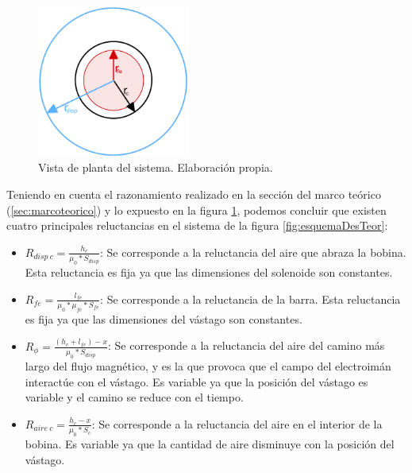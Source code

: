 \begin{figure}[H]
    \centering
    \includegraphics[width=5cm]{FigurasMemoria/areasFlujo.jpg}
    \caption{Vista de planta del sistema. Elaboración propia.}
    \label{fig:areasFlujo} %
\end{figure}

Teniendo en cuenta el razonamiento realizado en la sección del marco teórico (\ref{sec:marcoteorico}) y lo expuesto en la figura \ref{fig:areasFlujo}, podemos concluir que existen cuatro principales reluctancias en el sistema de la figura \ref{fig:esquemaDesTeor}:

\begin{itemize}
    \item \(R_{disp~c}=\frac{h_c}{\mu_0*S_{disp}}\): Se corresponde a la reluctancia del aire que abraza la bobina. Esta reluctancia es fija ya que las dimensiones del solenoide son constantes.
    \item \(R_{fe}=\frac{l_{fe}}{\mu_0*\mu_{fe}*S_{fe}}\): Se corresponde a la reluctancia de la barra. Esta reluctancia es fija ya que las dimensiones del vástago son constantes.
    \item \(R_{\phi}=\frac{(h_c+l_{fe})-x}{\mu_0*S_{disp}}\): Se corresponde a la reluctancia del aire del camino más largo del flujo magnético, y es la que provoca que el campo del electroimán interactúe con el vástago. Es variable ya que la posición del vástago es variable y el camino se reduce con el tiempo.
    \item \(R_{aire~c}=\frac{h_c-x}{\mu_0*S_c}\): Se corresponde a la reluctancia del aire en el interior de la bobina. Es variable ya que la cantidad de aire disminuye con la posición del vástago.
\end{itemize}

